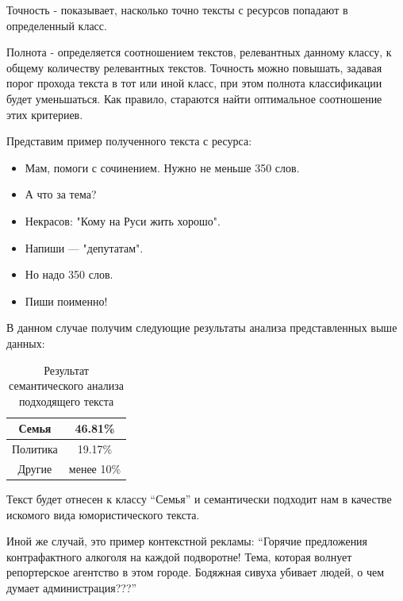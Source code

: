 Точность - показывает, насколько точно тексты с ресурсов попадают в определенный класс.

Полнота - определяется соотношением текстов, релевантных данному классу, к общему количеству релевантных текстов. Точность можно повышать, задавая порог прохода текста в тот или иной класс, при этом полнота классификации будет уменьшаться. Как правило, стараются найти оптимальное соотношение этих критериев.

Представим пример полученного текста с ресурса:

\begin{itemize} 
  \item Мам, помоги с сочинением. Нужно не меньше 350 слов.
  \item А что за тема? 
  \item Некрасов: "Кому на Руси жить хорошо". 
  \item Напиши — "депутатам".
  \item Но надо 350 слов.
  \item Пиши поименно!
\end{itemize}

В данном случае получим следующие результаты анализа представленных выше  данных:

\begin{table}[H]
  \caption{Результат семантического анализа подходящего текста}
  \label{tbl:text_a01}
  \begin{center}
  \begin{tabular}{ | c | c | }
    \hline
    Семья	& 46.81\% \\ \hline
    Политика &	19.17\% \\ \hline
    Другие	& менее 10\% \\ \hline
  \end{tabular}
  \end{center}
\end{table}

Текст будет отнесен к классу “Семья” и семантически подходит нам в качестве искомого вида юмористического текста.
	
Иной же случай, это пример контекстной рекламы:
“Горячие предложения контрафактного алкоголя на каждой подворотне! Тема, которая волнует репортерское агентство в этом городе. Бодяжная сивуха убивает людей, о чем думает администрация???”

